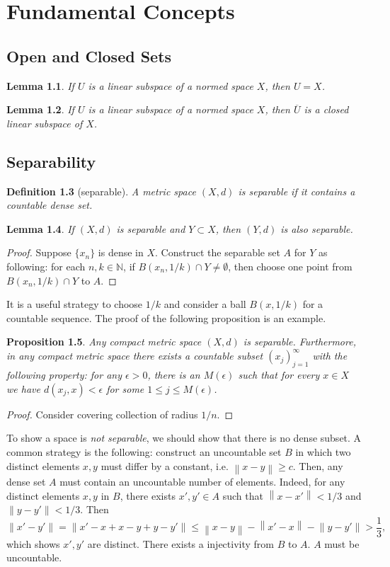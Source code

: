 \documentclass[12pt,a4paper]{report}
\numberwithin{equation}{section}
\theoremstyle{mystyle}
\newtheorem{definition}{Definition}[section]
\newtheorem{lemma}[definition]{Lemma}
\newtheorem{proposition}[definition]{Proposition}
\newcommand{\N}{\mathbb{N}}
\newcommand{\norm}[1]{\left\lVert #1 \right\rVert}
\begin{document}
	\chapter{Fundamental Concepts}
	\section{Open and Closed Sets}
	\begin{lemma}
		If $U$ is a linear subspace of a normed space $X$, then $U=X$.
	\end{lemma}
	
	\begin{lemma}
		If $U$ is a linear subspace of a normed space $X$, then $\overline{U}$ is a closed linear subspace of $X$.
	\end{lemma}
	
	
	
	
	\section{Separability}
	\begin{definition}[separable]
		A metric space $(X,d)$ is \emph{separable} if it contains a countable dense set.
	\end{definition}
	\begin{lemma}
		If $(X,d)$ is separable and $Y\subset X$, then $(Y,d)$ is also separable. 
	\end{lemma}
	\begin{proof}
		Suppose $\{x_n\}$ is dense in $X$. Construct the separable set $A$ for $Y$ as following: for each $n,k\in \N$, if $B(x_n,1/k)\cap Y\neq \emptyset$, then choose one point from $B(x_n,1/k)\cap Y$ to $A$.
	\end{proof}
	It is a useful strategy to choose $1/k$ and consider a ball $B(x,1/k)$ for a countable sequence. The proof of the following proposition is an example.
	\begin{proposition}
		Any compact metric space $(X,d)$ is separable. Furthermore, in any compact metric space there exists a countable subset $(x_j)_{j=1}^\infty$ with the following property: for any $\epsilon>0$, there is an $M(\epsilon)$ such that for every $x\in X$ we have $d(x_j,x)<\epsilon$ for some $1\leq j \leq M(\epsilon)$.
	\end{proposition}
	\begin{proof}
		Consider covering collection of radius $1/n$.
	\end{proof}
	
	To show a space is \emph{not separable}, we should show that there is no dense subset. A common strategy is the following: construct an uncountable set $B$ in which two distinct elements $x,y$ must differ by a constant, i.e. $\norm{x-y}\geq c$. Then, any dense set $A$ must contain an uncountable number of elements. Indeed, for any distinct elements $x,y$ in $B$, there exists $x',y'\in A$ such that $\norm{x-x'}<1/3$ and $\norm{y-y'}<1/3$. Then
	$$
	\norm{x'-y'} =\norm{x'-x+x-y+y-y'}\leq \norm{x-y}-\norm{x'-x}-\norm{y-y'}>\frac{1}{3},
	$$
	which shows $x',y'$ are distinct. There exists a injectivity from $B$ to $A$. $A$ must be uncountable.
	
\end{document}
